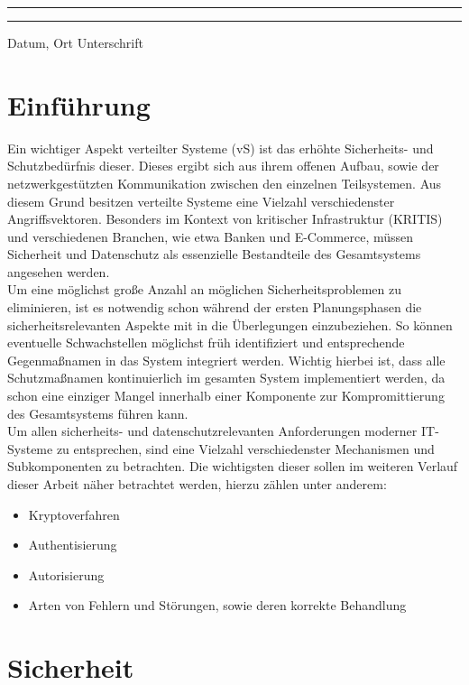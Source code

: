 \documentclass[12pt,a4paper,parskip=half]{scrreprt}
\begin{document}
		\vfill
		\noindent\rule{5cm}{.4pt}\hfill\rule{5cm}{.4pt}\par
		\noindent Datum, Ort \hfill Unterschrift 
		
	\tableofcontents
	
	
	\chapter{Einführung}
		
		Ein wichtiger Aspekt verteilter Systeme (vS) ist das erhöhte Sicherheits- und Schutzbedürfnis dieser. Dieses ergibt sich aus ihrem offenen Aufbau, sowie der netzwerkgestützten Kommunikation zwischen den einzelnen Teilsystemen. Aus diesem Grund besitzen verteilte Systeme eine Vielzahl verschiedenster Angriffsvektoren. Besonders im Kontext von kritischer Infrastruktur (KRITIS) und verschiedenen Branchen, wie etwa Banken und E-Commerce, müssen Sicherheit und Datenschutz als essenzielle Bestandteile des Gesamtsystems angesehen werden. \\
		Um eine möglichst große Anzahl an möglichen Sicherheitsproblemen zu eliminieren, ist es notwendig schon während der ersten Planungsphasen die sicherheitsrelevanten Aspekte mit in die Überlegungen einzubeziehen. So können eventuelle Schwachstellen möglichst früh identifiziert und entsprechende Gegenmaßnamen in das System integriert werden. Wichtig hierbei ist, dass alle Schutzmaßnamen kontinuierlich im gesamten System implementiert werden, da schon eine einziger Mangel innerhalb einer Komponente zur Kompromittierung des Gesamtsystems führen kann. \\
		Um allen sicherheits- und datenschutzrelevanten Anforderungen moderner IT-Systeme zu entsprechen, sind eine Vielzahl verschiedenster Mechanismen und Subkomponenten zu betrachten. Die wichtigsten dieser sollen im weiteren Verlauf dieser Arbeit näher betrachtet werden, hierzu zählen unter anderem:
		
		\begin{itemize}
			\item Kryptoverfahren
			\item Authentisierung
			\item Autorisierung
			\item Arten von Fehlern und Störungen, sowie deren korrekte Behandlung
		\end{itemize}
		
		
	\chapter{Sicherheit}
		
\end{document}
